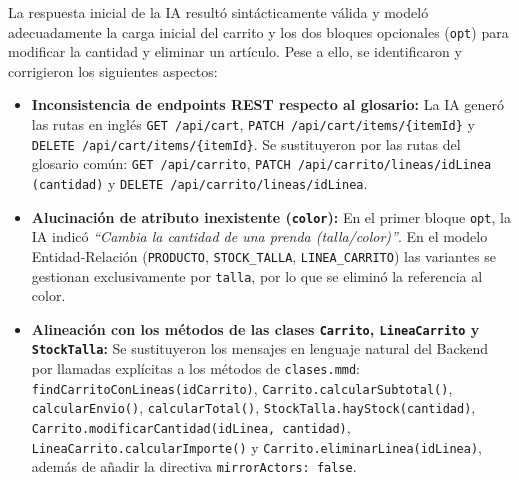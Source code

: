 La respuesta inicial de la IA resultó sintácticamente válida y modeló adecuadamente la carga inicial del carrito y los dos bloques opcionales (\texttt{opt}) para modificar la cantidad y eliminar un artículo. Pese a ello, se identificaron y corrigieron los siguientes aspectos:
\begin{itemize}[leftmargin=*,nosep]
\item \textbf{Inconsistencia de endpoints REST respecto al glosario:} La IA generó las rutas en inglés \texttt{GET /api/cart}, \texttt{PATCH /api/cart/items/\{itemId\}} y \texttt{DELETE /api/cart/items/\{itemId\}}. Se sustituyeron por las rutas del glosario común: \texttt{GET /api/carrito}, \texttt{PATCH /api/carrito/lineas/idLinea (cantidad)} y \texttt{DELETE /api/carrito/lineas/idLinea}.
\item \textbf{Alucinación de atributo inexistente (\texttt{color}):} En el primer bloque \texttt{opt}, la IA indicó \emph{``Cambia la cantidad de una prenda (talla/color)''}. En el modelo Entidad-Relación (\texttt{PRODUCTO}, \texttt{STOCK\_TALLA}, \texttt{LINEA\_CARRITO}) las variantes se gestionan exclusivamente por \texttt{talla}, por lo que se eliminó la referencia al color.
\item \textbf{Alineación con los métodos de las clases \texttt{Carrito}, \texttt{LineaCarrito} y \texttt{StockTalla}:} Se sustituyeron los mensajes en lenguaje natural del Backend por llamadas explícitas a los métodos de \texttt{clases.mmd}: \texttt{findCarritoConLineas(idCarrito)}, \texttt{Carrito.calcularSubtotal()}, \texttt{calcularEnvio()}, \texttt{calcularTotal()}, \texttt{StockTalla.hayStock(cantidad)}, \texttt{Carrito.modificarCantidad(idLinea, cantidad)}, \texttt{LineaCarrito.calcularImporte()} y \texttt{Carrito.eliminarLinea(idLinea)}, además de añadir la directiva \texttt{mirrorActors: false}.
\end{itemize}
